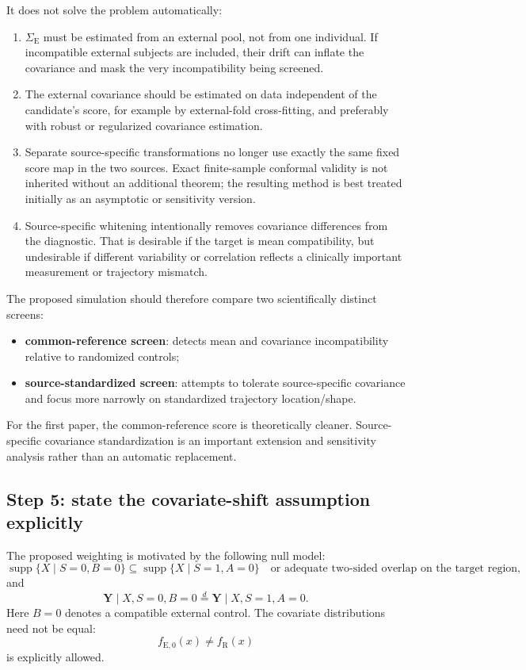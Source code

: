 \documentclass[11pt]{article}
\newcommand{\R}{\mathrm{R}}
\newcommand{\E}{\mathrm{E}}
\newcommand{\supp}{\operatorname{supp}}
\begin{document}
It does not solve the problem automatically:
\begin{enumerate}
    \item $\Sigma_{\E}$ must be estimated from an external pool, not from one individual. If incompatible external subjects are included, their drift can inflate the covariance and mask the very incompatibility being screened.
    \item The external covariance should be estimated on data independent of the candidate's score, for example by external-fold cross-fitting, and preferably with robust or regularized covariance estimation.
    \item Separate source-specific transformations no longer use exactly the same fixed score map in the two sources. Exact finite-sample conformal validity is not inherited without an additional theorem; the resulting method is best treated initially as an asymptotic or sensitivity version.
    \item Source-specific whitening intentionally removes covariance differences from the diagnostic. That is desirable if the target is mean compatibility, but undesirable if different variability or correlation reflects a clinically important measurement or trajectory mismatch.
\end{enumerate}

The proposed simulation should therefore compare two scientifically distinct screens:
\begin{itemize}
    \item \textbf{common-reference screen}: detects mean and covariance incompatibility relative to randomized controls;
    \item \textbf{source-standardized screen}: attempts to tolerate source-specific covariance and focus more narrowly on standardized trajectory location/shape.
\end{itemize}

For the first paper, the common-reference score is theoretically cleaner. Source-specific covariance standardization is an important extension and sensitivity analysis rather than an automatic replacement.

\subsection{Step 5: state the covariate-shift assumption explicitly}

The proposed weighting is motivated by the following null model:
\[
\supp\{X\mid S=0,B=0\}\subseteq \supp\{X\mid S=1,A=0\}
\quad\text{or adequate two-sided overlap on the target region},
\tag{8}
\]
and
\[
\bm Y\mid X,S=0,B=0
\overset d=
\bm Y\mid X,S=1,A=0.
\tag{9}
\]
Here $B=0$ denotes a compatible external control. The covariate distributions need not be equal:
\[
f_{\E,0}(x)\neq f_{\R}(x)
\]
is explicitly allowed.
\end{document}
